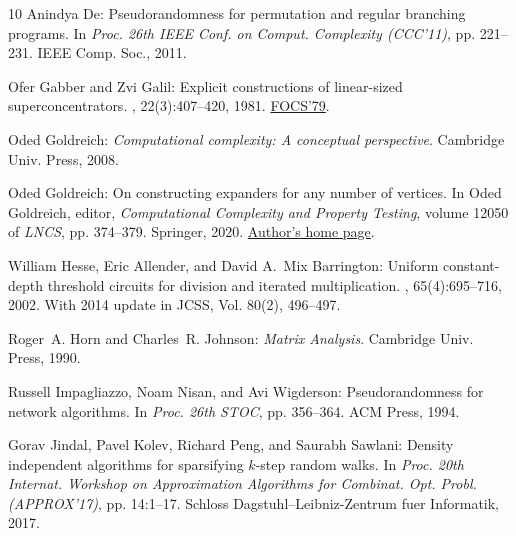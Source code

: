 \documentclass[11pt]{article}
\numberwithin{equation}{section}
\theoremstyle{definition}
\theoremstyle{plain}
\numberwithin{myalgctr}{section}
\theoremstyle{named}
\begin{document}
\begin{thebibliography}{10}
{\sc Anindya De}: Pseudorandomness for permutation and regular branching
  programs.
\newblock In {\em Proc. 26th IEEE Conf. on Comput. Complexity (CCC'11)}, pp.
  221--231. IEEE Comp. Soc., 2011.

{\sc Ofer Gabber and Zvi Galil}: Explicit constructions of linear-sized
  superconcentrators.
, 22(3):407--420, 1981.
\newblock \prelim \href{https://doi.org/10.1109/SFCS.1979.16}{FOCS'79}.
\newblock [\epfmtdoi{10.1016/0022-0000(81)90040-4}]

{\sc Oded Goldreich}: {\em Computational complexity: {A} conceptual
  perspective}.
\newblock Cambridge Univ. Press, 2008.

{\sc Oded Goldreich}: On constructing expanders for any number of vertices.
\newblock In {\sc Oded Goldreich}, editor, {\em Computational Complexity and
  Property Testing}, volume 12050 of {\em LNCS}, pp. 374--379. Springer, 2020.
\newblock \prelim
  \href{http://www.wisdom.weizmann.ac.il/~oded/VO/ex4all.pdf}{Author's home
  page}.
\newblock [\epfmtdoi{10.1007/978-3-030-43662-9\_21}]

{\sc William Hesse, Eric Allender, and David A.~Mix Barrington}: Uniform
  constant-depth threshold circuits for division and iterated multiplication.
, 65(4):695--716, 2002.
\newblock With 2014 update in JCSS, Vol. 80(2), 496--497.

{\sc Roger~A. Horn and Charles~R. Johnson}: {\em Matrix Analysis}.
\newblock Cambridge Univ. Press, 1990.

{\sc Russell Impagliazzo, Noam Nisan, and Avi Wigderson}: Pseudorandomness for
  network algorithms.
\newblock In {\em Proc. 26th STOC}, pp. 356--364. ACM Press, 1994.
\newblock [\epfmtdoi{10.1145/195058.195190}]

{\sc Gorav Jindal, Pavel Kolev, Richard Peng, and Saurabh Sawlani}: Density
  independent algorithms for sparsifying $k$-step random walks.
\newblock In {\em Proc. 20th Internat. Workshop on Approximation Algorithms for
  Combinat. Opt. Probl. (APPROX'17)}, pp. 14:1--17. Schloss
  Dagstuhl--Leibniz-Zentrum fuer Informatik, 2017.


\end{thebibliography}
\end{document}
